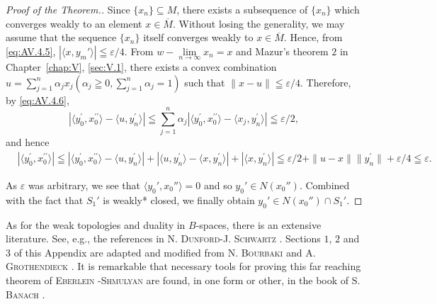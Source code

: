 \begin{proof}[Proof of the Theorem.]
Since $\{x_{n}\} \subseteq M$, there exists a subsequence of $\{x_{n}\}$ which converges weakly to an element $x \in \overline{M}$. Without losing the generality, we may assume that the sequence $\{x_{n}\}$ itself converges weakly to $x \in \overline{M}$. Hence, from \eqref{eq:AV.4.5}, $|\langle x, y_{m}' \rangle| \leqq \varepsilon / 4$. From $w - \lim\limits_{n \to \infty} x_{n} = x$ and Mazur's theorem $2$ in Chapter~\ref{chap:V}, \ref{sec:V.1}, there exists a convex combination $u = \sum\limits_{j=1}^{n} \alpha_{j} x_{j} \left( \alpha_{j} \geqq 0, \sum\limits_{j=1}^{n} \alpha_{j} = 1 \right)$ such that $\|x - u\| \leqq \varepsilon / 4$. Therefore, by \eqref{eq:AV.4.6}, 
\[
\left| \langle y _{0} ^{\prime}, x _{0} ^{\prime \prime} \rangle - \langle u, y _{n} ^{\prime} \rangle \right| \leqq \sum\limits_{j=1} ^{n} \alpha_{j} \left| \langle y _{0} ^{\prime}, x _{0} ^{\prime \prime} \rangle - \langle x _{j}, y _{n} ^{\prime} \rangle \right| \leqq \varepsilon / 2,
\]
and hence 
\[
\begin{aligned}
&\left| \langle y _{0} ^{\prime}, x _{0} ^{\prime \prime} \rangle \right|  \leqq \left| \langle y _{0} ^{\prime}, x _{0} ^{\prime \prime} \rangle - \langle u, y _{n} ^{\prime} \rangle \right| + \left| \langle u, y _{n} ^{\prime} \rangle - \langle x, y _{n} ^{\prime} \rangle \right| + \left| \langle x, y _{n} ^{\prime} \rangle \right| \leqq \varepsilon / 2 + \| u - x \| \| y _{n} ^{\prime} \| + \varepsilon / 4 \leqq \varepsilon .
\end{aligned}
\]

As $\varepsilon$ was arbitrary, we see that $\langle y_0', x_0'' \rangle = 0$ and so $y_0' \in N(x_0'')$. Combined with the fact that $S_1'$ is weakly* closed, we finally obtain $y_0' \in N(x_0'') \cap S_1'$. 
\end{proof}

\begin{remarku} As for the weak topologies and duality in $B$-spaces, there is an extensive literature. See, e.g., the references in N. \textsc{Dunford}-J. \textsc{Schwartz} \cite{dunford44}. Sections $1$, $2$ and $3$ of this Appendix are adapted and modified from N. \textsc{Bourbaki} \cite{bourbaki26} and A. \textsc{Grothendieck} \cite{grothendieck87}. It is remarkable that necessary tools for proving this far reaching theorem of \textsc{Eberlein} \cite{dunford52}-\textsc{Shmulyan} \cite{shmulyan302} are found, in one form or other, in the book of S. \textsc{Banach} \cite{banach9}. 
\end{remarku}
